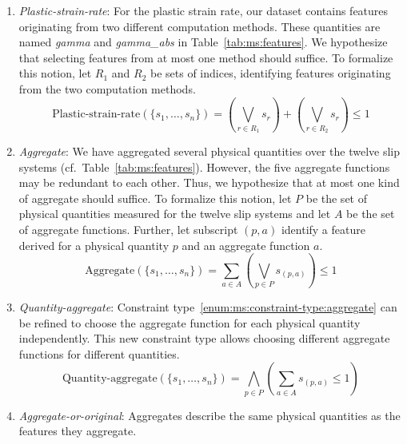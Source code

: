 \begin{enumerate}[label=(D\arabic*), wide]
	\item\label{enum:ms:constraint-type:plastic-strain-rate} \emph{Plastic-strain-rate}:
	For the plastic strain rate, our dataset contains features originating from two different computation methods.
	These quantities are named \emph{gamma} and \emph{gamma\_abs} in Table~\ref{tab:ms:features}.
	We hypothesize that selecting features from at most one method should suffice.
	To formalize this notion, let $R_1$ and $R_2$ be sets of indices, identifying features originating from the two computation methods.
	\begin{equation}
		\text{Plastic-strain-rate}(\{s_1, \dots, s_n\}) = \left( \bigvee_{r \in R_1} s_{r} \right) + \left( \bigvee_{r \in R_2} s_{r} \right) \leq 1
		\label{eq:ms:plastic-strain-rate}
	\end{equation}
	\item\label{enum:ms:constraint-type:aggregate} \emph{Aggregate}:
	We have aggregated several physical quantities over the twelve slip systems (cf.~Table~\ref{tab:ms:features}).
	However, the five aggregate functions may be redundant to each other.
	Thus, we hypothesize that at most one kind of aggregate should suffice.
	To formalize this notion, let $P$ be the set of physical quantities measured for the twelve slip systems and let $A$ be the set of aggregate functions.
	Further, let subscript $(p,a)$ identify a feature derived for a physical quantity $p$ and an aggregate function $a$.
	\begin{equation}
		\text{Aggregate}(\{s_1, \dots, s_n\}) = \sum_{a \in A} \left( \bigvee_{p \in P} s_{(p,a)} \right) \leq 1
		\label{eq:ms:constraint:aggregate}
	\end{equation}
	\item\label{enum:ms:constraint-type:quantity-aggregate} \emph{Quantity-aggregate}:
	Constraint type~\ref{enum:ms:constraint-type:aggregate} can be refined to choose the aggregate function for each physical quantity independently.
	This new constraint type allows choosing different aggregate functions for different quantities.
	\begin{equation}
		\text{Quantity-aggregate}(\{s_1, \dots, s_n\}) = \bigwedge_{p \in P} \left( \sum_{a \in A} s_{(p,a)} \leq 1 \right)
		\label{eq:ms:constraint:quantity-aggregate}
	\end{equation}
	\item\label{enum:ms:constraint-type:aggregate-or-original} \emph{Aggregate-or-original}:
	Aggregates describe the same physical quantities as the features they aggregate.

\end{enumerate}

